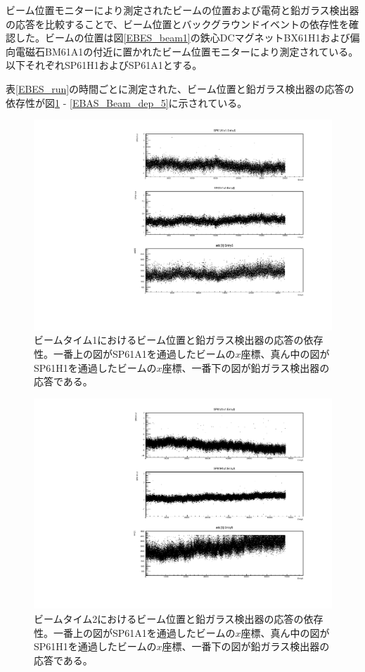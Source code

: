 ビーム位置モニターにより測定されたビームの位置および電荷と鉛ガラス検出器の応答を比較することで、ビーム位置とバックグラウンドイベントの依存性を確認した。ビームの位置は図\ref{EBES_beam1}の鉄心DCマグネットBX61H1および偏向電磁石BM61A1の付近に置かれたビーム位置モニターにより測定されている。以下それぞれSP61H1およびSP61A1とする。

表\ref{EBES_run}の時間ごとに測定された、ビーム位置と鉛ガラス検出器の応答の依存性が図\ref{EBAS_Beam_dep_1} - \ref{EBAS_Beam_dep_5}に示されている。

\begin{figure}[H]
	\begin{center}
		\includegraphics[width=330pt]{./Figure/EBES/BPB_dep1.pdf}
		\caption[ビームタイム1におけるビーム位置と鉛ガラス検出器の応答の依存性]{ビームタイム1におけるビーム位置と鉛ガラス検出器の応答の依存性。一番上の図がSP61A1を通過したビームの$x$座標、真ん中の図がSP61H1を通過したビームの$x$座標、一番下の図が鉛ガラス検出器の応答である。}
		\label{EBAS_Beam_dep_1}
	\end{center}
\end{figure}

\begin{figure}[H]
	\begin{center}
		\includegraphics[width=330pt]{./Figure/EBES/BPB_dep2.pdf}
		\caption[ビームタイム2におけるビーム位置と鉛ガラス検出器の応答の依存性]{ビームタイム2におけるビーム位置と鉛ガラス検出器の応答の依存性。一番上の図がSP61A1を通過したビームの$x$座標、真ん中の図がSP61H1を通過したビームの$x$座標、一番下の図が鉛ガラス検出器の応答である。}
		\label{EBAS_Beam_dep_2}
	\end{center}
\end{figure}

